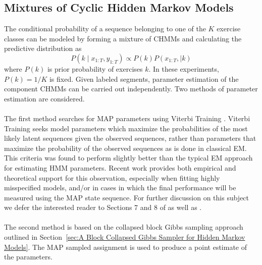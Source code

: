 \documentclass[12pt]{report}
\newcommand{\1}[0]{\mathbbm{1}}
\newcommand{\seq}[3]{\ensuremath{#1_{{#2}:{#3}}}}
\begin{document}
\subsection{Mixtures of Cyclic Hidden Markov Models}
The conditional probability of a sequence belonging to one of the
$K$ exercise classes can be modeled by forming a mixture of \acp{CHMM}
and calculating the predictive distribution as
\[
    P(k \mid \seq{x}{1}{T}, \seq{y}{1}{T}) \propto P(k)P(\seq{x}{1}{T}, \mid k)
\]
where $P(k)$ is prior probability of exercises $k$.
In these experiments, $P(k) = 1 / K$ is fixed. Given labeled segments,
parameter estimation of the component \acp{CHMM} can be carried
out independently. Two methods of parameter estimation are considered.
\\\\
The first method searches for \ac{MAP} parameters using Viterbi Training
\cite{segmental-kmeans}. Viterbi Training seeks model parameters which maximize
the probabilities of the most likely latent sequences given the observed sequences,
rather than parameters that maximize the probability of the observed sequences as is done
in classical \ac{EM}. This criteria was found to perform slightly better than the typical
\ac{EM} approach for estimating \ac{HMM} parameters. Recent work provides both empirical
and theoretical support for this observation, especially when fitting highly misspecified models,
and/or in cases in which the final performance will be measured using
the MAP state sequence. For further discussion on this subject we defer the interested reader
to Sections 7 and 8 of \cite{viterbi-em} as well as \cite{estimate-wrong}.
\\\\
The second method is based on the collapsed block Gibbs sampling approach outlined in
Section~\ref{sec:A Block Collapsed Gibbs Sampler for Hidden Markov Models}.
The MAP sampled assignment is used to produce a point estimate of the parameters.
\end{document}
